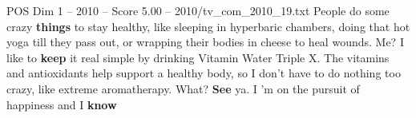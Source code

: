 \begin{textsample}{POS Dim 1 – 2010 – Score 5.00 – 2010/tv\_com\_2010\_19.txt}  \label{ex:f1_pos_063}
People do some crazy \textbf{things} to stay healthy, like sleeping in hyperbaric chambers, doing that hot yoga till they pass out, or wrapping their bodies in cheese to heal wounds.
Me?
I like to \textbf{keep} it real simple by drinking Vitamin Water Triple X.
The vitamins and antioxidants help support a healthy body, so I don't have to do nothing too crazy, like extreme aromatherapy.
What? \textbf{See} ya.
I 'm on the pursuit of happiness and I \textbf{know}

\end{textsample}
